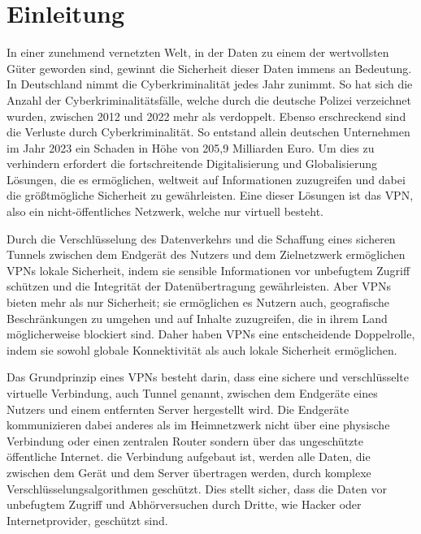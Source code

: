 \chapter{Einleitung}
In einer zunehmend vernetzten Welt, in der Daten zu einem der wertvollsten Güter geworden sind, gewinnt die Sicherheit dieser Daten immens an Bedeutung. In Deutschland nimmt die Cyberkriminalität jedes Jahr zunimmt. So hat sich die Anzahl der Cyberkriminalitätsfälle, welche durch die deutsche Polizei verzeichnet wurden, zwischen 2012 und 2022 mehr als verdoppelt. \cite{Filed_cybercrime_cases_Germany_2022} Ebenso erschreckend sind die Verluste durch Cyberkriminalität. So entstand allein deutschen Unternehmen im Jahr 2023 ein Schaden in Höhe von 205,9 Milliarden Euro. \cite{Cybercrime_financial_loss_in_Germany_2023} Um dies zu verhindern erfordert die fortschreitende Digitalisierung und Globalisierung Lösungen, die es ermöglichen, weltweit auf Informationen zuzugreifen und dabei die größtmögliche Sicherheit zu gewährleisten. Eine dieser Lösungen ist das \gls{VPN}, also ein nicht-öffentliches Netzwerk, welche nur virtuell besteht. 

Durch die Verschlüsselung des Datenverkehrs und die Schaffung eines sicheren Tunnels zwischen dem Endgerät des Nutzers und dem Zielnetzwerk ermöglichen \gls{VPN}s lokale Sicherheit, indem sie sensible Informationen vor unbefugtem Zugriff schützen und die Integrität der Datenübertragung gewährleisten. Aber \gls{VPN}s bieten mehr als nur Sicherheit; sie ermöglichen es Nutzern auch, geografische Beschränkungen zu umgehen und auf Inhalte zuzugreifen, die in ihrem Land möglicherweise blockiert sind. Daher haben \gls{VPN}s eine entscheidende Doppelrolle, indem sie sowohl globale Konnektivität als auch lokale Sicherheit ermöglichen. \cite{Vergleich_der_besten_VPN-Protokolle_Nord_VPN}

Das Grundprinzip eines \gls{VPN}s besteht darin, dass eine sichere und verschlüsselte virtuelle Verbindung, auch Tunnel genannt, zwischen dem Endgeräte eines Nutzers und einem entfernten Server hergestellt wird. Die Endgeräte kommunizieren dabei anderes als im Heimnetzwerk nicht über eine physische Verbindung oder einen zentralen Router sondern über das ungeschützte öffentliche Internet. die Verbindung aufgebaut ist, werden alle Daten, die zwischen dem Gerät und dem Server übertragen werden, durch komplexe Verschlüsselungsalgorithmen geschützt. Dies stellt sicher, dass die Daten vor unbefugtem Zugriff und Abhörversuchen durch Dritte, wie Hacker oder Internetprovider, geschützt sind. \cite{Vergleich_der_besten_VPN-Protokolle_Nord_VPN}\cite{Wie_funktioniert_ein_Virtual_Private_Network_VPN}

